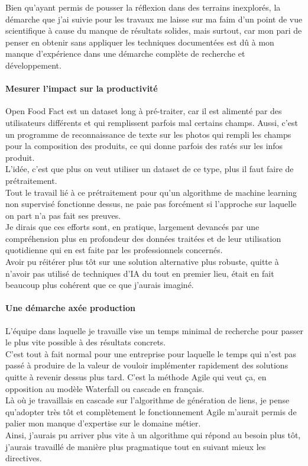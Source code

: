 \documentclass{rapportCS}
\begin{document}
Bien qu'ayant permis de pousser la réflexion dans des terrains inexplorés,
la démarche que j'ai suivie pour les travaux me laisse sur ma faim d'un point de vue 
scientifique à cause du manque de résultats solides, mais surtout,
car mon pari de penser en obtenir sans appliquer les techniques documentées est 
dû à mon manque d'expérience dans une démarche complète de recherche et développement.

\paragraph{Mesurer l'impact sur la productivité}
Open Food Fact est un dataset long à pré-traiter, car il est alimenté par des utilisateurs 
différents et qui remplissent parfois mal certains champs.
Aussi, c'est un programme de reconnaissance de texte sur les photos qui rempli les champs
pour la composition des produits, ce qui donne parfois des ratés sur les infos produit.\\

L'idée, c'est que plus on veut utiliser un dataset de ce type, plus il faut faire de prétraitement.\\
Tout le travail lié à ce prétraitement pour qu'un algorithme de machine learning non supervisé
fonctionne dessus, ne paie pas forcément si l'approche sur laquelle on part n'a pas fait ses preuves.\\
Je dirais que ces efforts sont, en pratique, largement devancés par une compréhension 
plus en profondeur des données traitées 
et de leur utilisation quotidienne qui en est faite par les professionnels concernés.\\

Avoir pu réitérer plus tôt sur une solution alternative plus robuste, quitte à
n'avoir pas utilisé de techniques d'IA du tout en premier lieu, était en fait
beaucoup plus cohérent que ce que j'aurais imaginé.\\

\paragraph{Une démarche axée production}

L'équipe dans laquelle je travaille vise un temps minimal de recherche
pour passer le plus vite possible à des résultats concrets.\\
C'est tout à fait normal pour une entreprise pour laquelle le temps qui n'est
pas passé à produire de la valeur de vouloir implémenter rapidement des solutions
quitte à revenir dessus plus tard. C'est la méthode Agile qui veut ça,
en opposition au modèle Waterfall ou cascade en français.\\
Là où je travaillais en cascade sur l'algorithme de génération de liens,
je pense qu'adopter très tôt et complètement le fonctionnement Agile m'aurait 
permis de palier mon manque d'expertise sur le domaine métier.\\
Ainsi, j'aurais pu arriver plus vite à un algorithme qui répond au besoin
plus tôt, j'aurais travaillé de manière plus pragmatique tout en suivant
mieux les directives.
\end{document}
